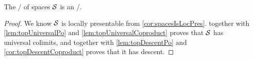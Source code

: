 \begin{corollary}
    The \inftycat/ of spaces $\mathcal{S}$ is an \inftytop/.
    \begin{proof}
        We know $\mathcal{S}$ is locally presentable from \cref{cor:spacesIsLocPres}.
         together with \cref{lem:topUniversalPo} and \cref{lem:topUniversalCoproduct} proves that $\mathcal{S}$ has universal colimits, and together with \cref{lem:topDescentPo} and \cref{cor:topDescentCoproduct} proves that it has descent.
    \end{proof}
\end{corollary}